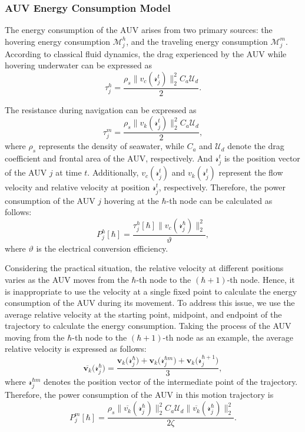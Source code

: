 \documentclass{article}
\begin{document}
\subsubsection{AUV Energy Consumption Model}\label{se:3.4}
The energy consumption of the AUV arises from two primary sources: the hovering energy consumption $\mathcal{M}_j^h$, and the traveling energy consumption $\mathcal{M}_j^m$. According to classical fluid dynamics, the drag experienced by the AUV while hovering underwater can be expressed as
\begin{equation}\label{eq:11}
\tau_j^h=\frac{\rho_s\|v_c(\mathcal{r}_j^t)\|_2^2C_a\mathcal{U}_d}{2}.
\end{equation}

The resistance during navigation can be expressed as
\begin{equation}\label{eq:12}
\tau_j^m=\frac{\rho_s\|v_k(\mathcal{r}_j^t)\|_2^2C_a\mathcal{U}_d}{2},
\end{equation}
where $\rho_s$ represents the density of seawater, while $C_a$ and $\mathcal{U}_d$ denote the drag coefficient and frontal area of the AUV, respectively. And $\mathcal{r}_j^t$ is the position vector of the AUV $j$ at time $t$. Additionally, $v_c(\mathcal{r}_j^t)$ and $v_k(\mathcal{r}_j^t)$ represent the flow velocity and relative velocity at position $\mathcal{r}_j^t$, respectively. Therefore, the power consumption of the AUV $j$ hovering at the $\hbar$-th node can be calculated as follows:
\begin{equation}\label{eq:13}
P_j^h[\hbar]=\frac{\tau_j^h[\hbar]\|v_c(\mathcal{r}_j^\hbar)\|_2^2}{\vartheta},
\end{equation}
where $\vartheta$ is the electrical conversion efficiency.

Considering the practical situation, the relative velocity at different positions varies as the AUV moves from the $\hbar$-th node to the $(\hbar+1)$-th node. Hence, it is inappropriate to use the velocity at a single fixed point to calculate the energy consumption of the AUV during its movement. To address this issue, we use the average relative velocity at the starting point, midpoint, and endpoint of the trajectory to calculate the energy consumption. Taking the process of the AUV moving from the $\hbar$-th node to the $(\hbar+1)$-th node as an example, the average relative velocity is expressed as follows:
\begin{equation}\label{eq:14}
\overline{\boldsymbol{v}_k}\big(\mathcal{r}_j^\hbar\big)=\frac{\boldsymbol{v}_k\big(\mathcal{r}_j^\hbar\big)+\boldsymbol{v}_k\big(\mathcal{r}_j^{\hbar m}\big)+\boldsymbol{v}_k\big(\mathcal{r}_j^{\hbar+1}\big)}{3},
\end{equation}
where $\mathcal{r}_j^{\hbar m}$ denotes the position vector of the intermediate point of the trajectory. Therefore, the power consumption of the AUV in this motion trajectory is
\begin{equation}\label{eq:15}
P_j^m[\hbar]=\frac{\rho_s\|\overline{v_k}(\mathcal{r}_j^\hbar)\|_2^2C_a\mathcal{U}_d\|\overline{v_k}(\mathcal{r}_j^\hbar)\|_2^2}{2\zeta}.
\end{equation}
\end{document}

